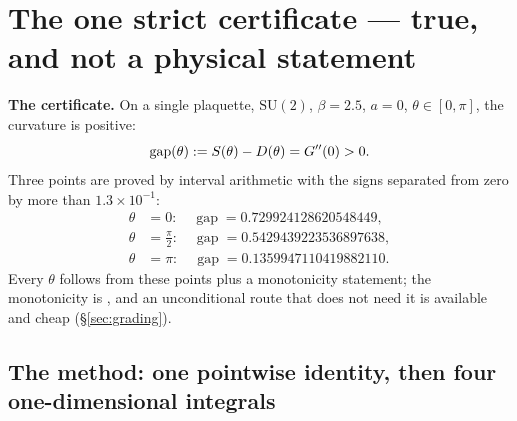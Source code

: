 \section{The one strict certificate --- true, and not a physical statement}
\label{sec:cert}

\begin{keybox}
\textbf{The certificate.} On a single plaquette, $\mathrm{SU}(2)$, $\beta=2.5$, $a=0$,
$\theta\in[0,\pi]$, the curvature is positive:
\[
\operatorname{gap}(\theta):=S(\theta)-D(\theta)=G''(0)>0 .
\]
Three points are proved by interval arithmetic with the signs separated from zero by more than
$1.3\times10^{-1}$:
\[
\begin{aligned}
\theta&=0:\quad \operatorname{gap}=0.729924128620548449,\\
\theta&=\tfrac{\pi}{2}:\quad \operatorname{gap}=0.5429439223536897638,\\
\theta&=\pi:\quad \operatorname{gap}=0.1359947110419882110 .
\end{aligned}
\]
Every $\theta$ follows from these points plus a monotonicity statement; the monotonicity is
\LC{}, and an unconditional route that does not need it is available and cheap
(\S\ref{sec:grading}).
\end{keybox}

\subsection{The method: one pointwise identity, then four one-dimensional integrals}


